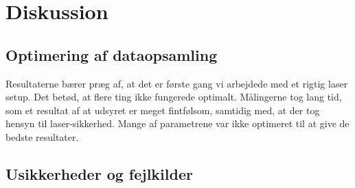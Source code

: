 \documentclass[main]{subfiles}
\begin{document}
\section{Diskussion}
\subsection{Optimering af dataopsamling}
Resultaterne bærer præg af, at det er første gang vi arbejdede med et rigtig laser setup. Det betød, at flere ting ikke fungerede optimalt. Målingerne tog lang tid, som et resultat af at udsyret er meget fintfølsom, samtidig med, at der tog hensyn til laser-sikkerhed. Mange af parametrene var ikke optimeret til at give de bedste resultater. 
\subsection{Usikkerheder og fejlkilder}
\end{document}
